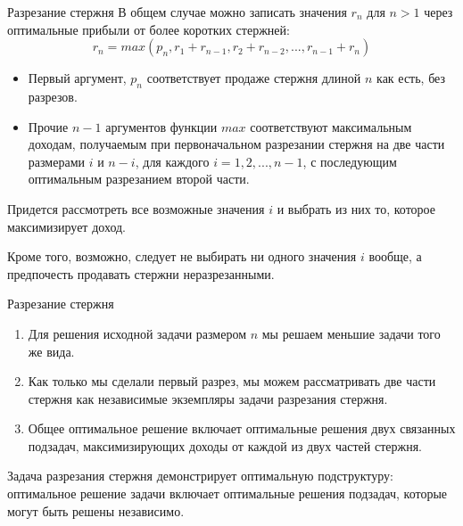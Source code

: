 \documentclass{beamer}
\begin{document}
\begin{frame}[t]{Разрезание стержня}
    В общем случае можно записать значения $r_n$ для $n>1$ через оптимальные прибыли от более коротких стержней:
    \[r_n=max(p_n, r_1+r_{n-1}, r_2+r_{n-2},...,r_{n-1}+r_n)\]

    \begin{itemize}
        \item Первый аргумент, $p_n$ соответствует продаже стержня длиной $n$ как есть, без разрезов.
        \item Прочие $n-1$ аргументов функции $max$ соответствуют максимальным доходам, получаемым при первоначальном разрезании стержня на две части размерами $i$ и $n-i$, для каждого $i=1, 2,..., n-1$, с последующим оптимальным разрезанием второй части. 
    \end{itemize}
    
    Придется рассмотреть все возможные значения $i$ и выбрать из них то, которое максимизирует доход. 
    
    Кроме того, возможно, следует не выбирать ни одного значения $i$ вообще, а предпочесть продавать стержни неразрезанными.
\end{frame}

\begin{frame}[t]{Разрезание стержня}
    \begin{enumerate}
        \item Для решения исходной задачи размером $n$ мы решаем меньшие задачи того же вида. 
        \item Как только мы сделали первый разрез, мы можем рассматривать две части стержня как независимые экземпляры задачи разрезания стержня. 
        \item Общее оптимальное решение включает оптимальные решения двух связанных подзадач, максимизирующих доходы от каждой из двух частей стержня. 
    \end{enumerate}
    
    \begin{block}{Задача разрезания стержня}
        демонстрирует оптимальную подструктуру: оптимальное решение задачи включает оптимальные решения подзадач, которые могут быть решены независимо.
    \end{block}
\end{frame}
\end{document}
